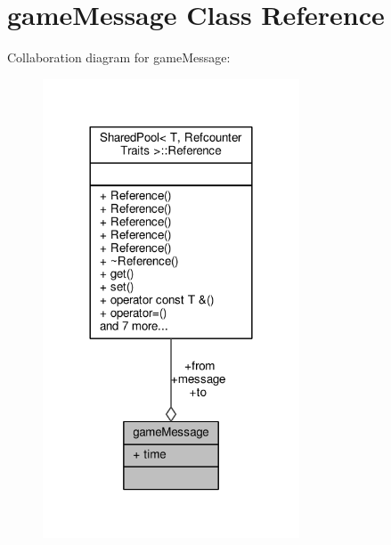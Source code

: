 \hypertarget{classgameMessage}{}\section{game\+Message Class Reference}
\label{classgameMessage}


Collaboration diagram for game\+Message\+:
\nopagebreak
\begin{figure}[H]
\begin{center}
\leavevmode
\includegraphics[width=216pt]{d0/d1f/classgameMessage__coll__graph}
\end{center}
\end{figure}
